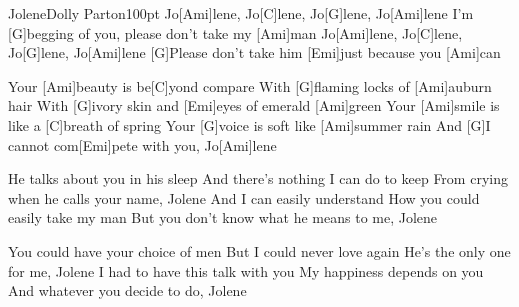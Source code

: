 \begin{song}{Jolene}{Dolly Parton}{100pt}
\chorus%
Jo[Ami]lene, Jo[C]lene, Jo[G]lene, Jo[Ami]lene
I'm [G]begging of you, please don't take my [Ami]man
Jo[Ami]lene, Jo[C]lene, Jo[G]lene, Jo[Ami]lene
[G]Please don't take him [Emi]just because you [Ami]can

%
Your [Ami]beauty is be[C]yond compare
With [G]flaming locks of [Ami]auburn hair
With [G]ivory skin and [Emi]eyes of emerald [Ami]green
Your [Ami]smile is like a [C]breath of spring
Your [G]voice is soft like [Ami]summer rain
And [G]I cannot com[Emi]pete with you, Jo[Ami]lene

%
He talks about you in his sleep
And there's nothing I can do to keep
From crying when he calls your name, Jolene
And I can easily understand
How you could easily take my man
But you don't know what he means to me, Jolene
\repchor

%
You could have your choice of men
But I could never love again
He's the only one for me, Jolene
I had to have this talk with you
My happiness depends on you
And whatever you decide to do, Jolene
\repchor
\end{song}
